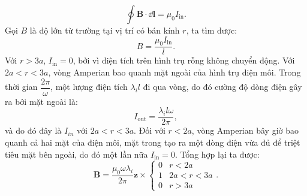 \begin{loigiai}
\begin{enumerate}[1)]
$$
\oint \mathbf{B} \cdot \dd \mathbf{l}=\mu_{0} I_{\mathrm{in}}.
$$
Gọi $B$ là độ lớn từ trường tại vị trí có bán kính $r$, ta tìm được:
$$B=\dfrac{\mu_0 I_{\mathrm{in}}}{l}.$$
Với $r>3a$, $I_{\mathrm{in}}=0$, bởi vì điện tích trên hình trụ rỗng không chuyển động. Với $2a<r<3a$, vòng Amperian bao quanh mặt ngoài của hình trụ điện môi. Trong thời gian $\dfrac{2\pi}{\omega}$, một lượng điện tích $\lambda_i l$ đi qua vòng, do đó cường độ dòng điện gây ra bởi mặt ngoài là:
$$I_{\mathrm{out}}=\dfrac{\lambda_i l\omega}{2\pi},$$
và do đó đây là $I_{in}$ với $2a<r<3a$. Đối với $r<2a$, vòng Amperian bây giờ bao quanh cả hai mặt của điện môi, mặt trong tạo ra một dòng điện vừa đủ để triệt tiêu mặt bên ngoài, do đó một lần nữa $I_{\mathrm{in}}=0$. Tổng hợp lại ta được:
$$
\mathbf{B}=\frac{\mu_{0} \omega \lambda_{i}}{2 \pi} \mathbf{z} \times \begin{cases}0 & r<2 a \\ 1 & 2 a<r<3 a \\ 0 & r>3 a\end{cases}.
$$
\end{enumerate}
\end{loigiai}





